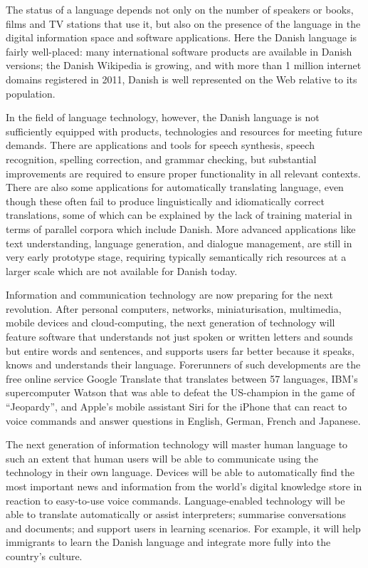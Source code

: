 \begin{multicols}{2}
The status of a language depends not only on the number of speakers or
books, films and TV stations that use it, but also on the presence of
the language in the digital information space and software
applications. Here the Danish language is fairly well-placed: many
international software products are available in Danish versions; the
Danish Wikipedia is growing, and with more than 1 million internet
domains registered in 2011, Danish is well represented on the Web
relative to its population.

In the field of language technology, however, the Danish language is
not sufficiently equipped with products, technologies and resources
for meeting future demands. There are applications and tools for
speech synthesis, speech recognition, spelling correction, and grammar
checking, but substantial improvements are required to ensure proper
functionality in all relevant contexts. There are also some
applications for automatically translating language, even though these
often fail to produce linguistically and idiomatically correct
translations, some of which can be explained by the lack of training
material in terms of parallel corpora which include Danish.  More
advanced applications like text understanding, language generation,
and dialogue management, are still in very early prototype stage,
requiring typically semantically rich resources at a larger scale
which are not available for Danish today.

Information and communication technology are now preparing for the
next revolution. After personal computers, networks, miniaturisation,
multimedia, mobile devices and cloud-computing, the next generation of
technology will feature software that understands not just spoken or
written letters and sounds but entire words and sentences, and
supports users far better because it speaks, knows and understands
their language. Forerunners of such developments are the free online
service Google Translate that translates between 57 languages, IBM's
supercomputer Watson that was able to defeat the US-champion in the
game of ``Jeopardy'', and Apple's mobile assistant Siri for the
iPhone that can react to voice commands and answer questions in
English, German, French and Japanese.

The next generation of information technology will master human
language to such an extent that human users will be able to
communicate using the technology in their own language. Devices will
be able to automatically find the most important news and information
from the world’s digital knowledge store in reaction to easy-to-use
voice commands. Language-enabled technology will be able to translate
automatically or assist interpreters; summarise conversations and
documents; and support users in learning scenarios. For example, it
will help immigrants to learn the Danish language and integrate more
fully into the country’s culture.


\end{multicols}
